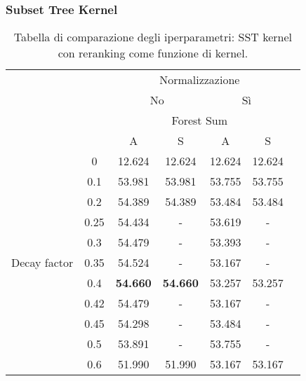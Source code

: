 \subsubsection{Subset Tree Kernel}

\begin{table}[H]
    \centering
    \begin{tabular}{cc|ccccc}
        \toprule
        &       & \multicolumn{4}{c}{Normalizzazione}                           \\
        &       & \multicolumn{2}{c}{No} & \multicolumn{2}{c}{Sì}               \\
        \hline
        &       & \multicolumn{4}{c}{Forest Sum}                                \\
        &       & A                 & S                 & A         & S         \\
        \hline
        \multirow{12}{*}{\begin{sideways}Decay factor\end{sideways}} 
        & 0     & 12.624            & 12.624            & 12.624    & 12.624    \\
        & 0.1   & 53.981            & 53.981            & 53.755    & 53.755    \\
        & 0.2   & 54.389            & 54.389            & 53.484    & 53.484    \\
        & 0.25  & 54.434            & -                 & 53.619    & -         \\
        & 0.3   & 54.479            & -                 & 53.393    & -         \\
        & 0.35  & 54.524            & -                 & 53.167    & -         \\
        & 0.4   & \textbf{54.660}   & \textbf{54.660}   & 53.257    & 53.257    \\
        & 0.42  & 54.479            & -                 & 53.167    & -         \\
        & 0.45  & 54.298            & -                 & 53.484    & -         \\
        & 0.5   & 53.891            & -                 & 53.755    & -         \\
        & 0.6   & 51.990            & 51.990            & 53.167    & 53.167    \\
        \bottomrule
    \end{tabular}
    \caption{Tabella di comparazione degli iperparametri: SST kernel con
    reranking come funzione di kernel.}
\end{table}

